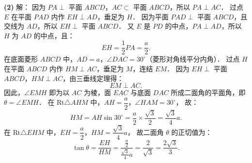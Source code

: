 \begin{answer}
\textbf{(2)} 解：
因为 $PA \perp$ 平面 $ABCD$，$AC \subset$ 平面 $ABCD$，所以 $PA \perp AC$．
过点 $E$ 在平面 $PAD$ 内作 $EH \perp AD$，垂足为 $H$．
因为平面 $PAD \perp$ 平面 $ABCD$，且交线为 $AD$，所以 $EH \perp$ 平面 $ABCD$．
又 $E$ 是 $PD$ 的中点，$PA \perp AD$，所以 $H$ 为 $AD$ 的中点，且：
\nopagebreak[4]
\[
EH = \frac{1}{2}PA = \frac{a}{2}.
\]
在底面菱形 $ABCD$ 中，$AD = a$，$\angle DAC = 30^\circ$（菱形对角线平分内角）．
过点 $H$ 在平面 $ABCD$ 内作 $HM \perp AC$，垂足为 $M$，连结 $EM$．
因为 $EH \perp$ 平面 $ABCD$，$HM \perp AC$，由三垂线定理得：
\nopagebreak[4]
\[
EM \perp AC.
\]
因此，$\angle EMH$ 即为以 $AC$ 为棱，面 $EAC$ 与底面 $DAC$ 所成二面角的平面角，即 $\theta = \angle EMH$．
在 Rt$\triangle AHM$ 中，$AH = \dfrac{a}{2}$，$\angle HAM = 30^\circ$，
故：
\nopagebreak[4]
\[
HM = AH \sin 30^\circ = \frac{a}{2} \times \frac{\sqrt{3}}{2} = \frac{\sqrt{3}}{4}a.
\]
在 Rt$\triangle EHM$ 中，$EH = \dfrac{a}{2}$，$HM = \dfrac{\sqrt{3}}{4}a$，
故二面角 $\theta$ 的正切值为：
\nopagebreak[4]
\[
\tan\theta = \frac{EH}{HM} = \frac{\frac{a}{2}}{\frac{\sqrt{3}}{4}a} = \frac{2}{\sqrt{3}} = \frac{2\sqrt{3}}{3}.
\]



\end{answer}

